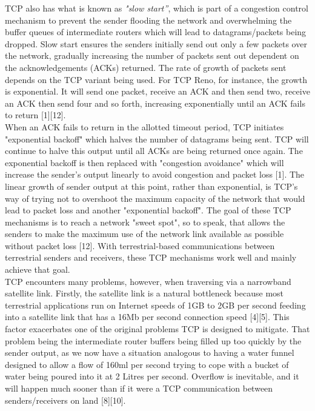 \documentclass{uathesis}
\begin{document}
TCP also has what is known as \emph{"slow start”}, which is part of a congestion control mechanism to prevent the sender flooding the network and overwhelming the buffer queues of intermediate routers which will lead to datagrams/packets being dropped. Slow start ensures the senders initially send out only a few packets over the network, gradually increasing the number of packets sent out dependent on the acknowledgements (ACKs) returned. The rate of growth of packets sent depends on the TCP variant being used. For TCP Reno, for instance, the growth is exponential. It will send one packet, receive an ACK and then send two, receive an ACK then send four and so forth, increasing exponentially until an ACK fails to return [1][12]. \\

When an ACK fails to return in the allotted timeout period, TCP initiates "exponential backoff" which halves the number of datagrams being sent. TCP will continue to halve this output until all ACKs are being returned once again. The exponential backoff is then replaced with "congestion avoidance" which will increase the sender's output linearly to avoid congestion and packet loss [1]. The linear growth of sender output at this point, rather than exponential, is TCP's way of trying not to overshoot the maximum capacity of the network that would lead to packet loss and another "exponential backoff". The goal of these TCP mechanisms is to reach a network "sweet spot", so to speak, that allows the senders to make the maximum use of the network link available as possible without packet loss \cite{ref1}[12]. With terrestrial-based communications between terrestrial senders and receivers, these TCP mechanisms work well and mainly achieve that goal. \\

TCP encounters many problems, however, when traversing via a narrowband satellite link. Firstly, the satellite link is a natural bottleneck because most terrestrial applications run on Internet speeds of 1GB to 2GB per second feeding into a satellite link that has a 16Mb per second connection speed [4][5]. This factor exacerbates one of the original problems TCP is designed to mitigate. That problem being the intermediate router buffers being filled up too quickly by the sender output, as we now have a situation analogous to having a water funnel designed to allow a flow of 160ml per second trying to cope with a bucket of water being poured into it at 2 Litres per second. Overflow is inevitable, and it will happen much sooner than if it were a TCP communication between senders/receivers on land [8][10]. \\
\end{document}
